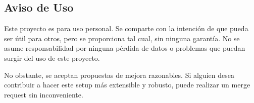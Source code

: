\documentclass[11pt]{article}
\begin{document}
\subsection*{Aviso de Uso}

Este proyecto es para uso personal. Se comparte con la intención de que pueda ser útil para otros, pero se proporciona tal cual, sin ninguna garantía. No se asume responsabilidad por ninguna pérdida de datos o problemas que puedan surgir del uso de este proyecto.

\vspace{5pt}

No obstante, se aceptan propuestas de mejora razonables. Si alguien desea contribuir a hacer este setup más extensible y robusto, puede realizar un merge request sin inconveniente.
\end{document}
